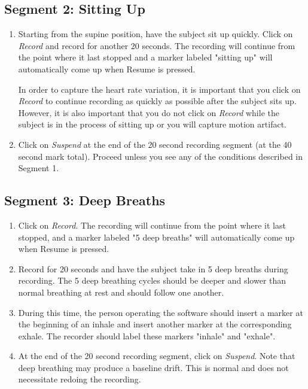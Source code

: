 \documentclass{article}
\begin{document}
\subsection*{Segment 2: Sitting Up}
\begin{enumerate}
	\item Starting from the supine position, have the subject sit up quickly. Click on \textit{Record} and record for another 20 seconds. The recording will continue from the point where it last stopped and a marker labeled "sitting up" will automatically come up when Resume is pressed.\begin{info}
In order to capture the heart rate variation, it is important that you click on \textit{Record} to continue recording as quickly as possible after the subject sits up. However, it is also important that you do not click on \textit{Record} while the subject is in the process of sitting up or you will capture motion artifact.	
\end{info}
	\item Click on \textit{Suspend} at the end of the 20 second recording segment (at the 40 second mark total). Proceed unless you see any of the conditions described in Segment 1.
\end{enumerate}

\subsection*{Segment 3: Deep Breaths}
\begin{enumerate}
	\item Click on \textit{Record}. The recording will continue from the point where it last stopped, and a marker labeled "5 deep breaths" will automatically come up when Resume is pressed.
	\item Record for 20 seconds and have the subject take in 5 deep breaths during recording. The 5 deep breathing cycles should be deeper and slower than normal breathing at rest and should follow one another.
	\item During this time, the person operating the software should insert a marker at the beginning of an inhale and insert another marker at the corresponding exhale. The recorder should label these markers "inhale" and "exhale".
	\item At the end of the 20 second recording segment, click on \textit{Suspend}. Note that deep breathing may produce a baseline drift. This is normal and does not necessitate redoing the recording.
\end{enumerate}
\end{document}
